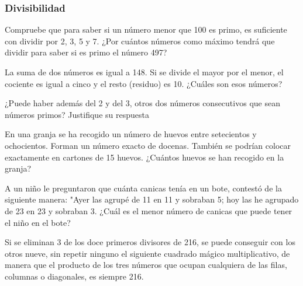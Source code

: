 \documentclass[letterpaper,11pt,twoside]{article}
\begin{document}
\begin{enumerate}
\subsubsection*{Divisibilidad}
\item Compruebe que para saber si un número menor que 100 es primo, es suficiente con dividir por 2, 3, 5 y 7. ¿Por cuántos números como máximo tendrá que dividir para saber si es primo el número 497?
\item La suma de dos números es igual a 148. Si se divide el mayor por el menor, el cociente es igual a cinco y el resto (residuo) es 10. ¿Cuáles son esos números?
\item ¿Puede haber además del 2 y del 3, otros dos números consecutivos que sean números primos? Justifique su respuesta
\item En una granja se ha recogido un número de huevos entre setecientos y ochocientos. Forman un número exacto de docenas. También se podrían colocar exactamente en cartones de 15 huevos. ¿Cuántos huevos se han recogido en la granja?
\item A un niño le preguntaron que cuánta canicas tenía en un bote, contestó de la siguiente manera: "Ayer las agrupé de 11 en 11 y sobraban 5; hoy las he agrupado de 23 en 23 y sobraban 3. ¿Cuál es el menor número de canicas que puede tener el niño en el bote?

\begin{minipage}{.65\textwidth}
\item Si se eliminan 3 de los doce primeros divisores de 216, se puede conseguir con los otros nueve, sin repetir ninguno el siguiente cuadrado mágico multiplicativo, de manera que el producto de los tres números que ocupan cualquiera de las filas, columnas o diagonales, es siempre 216.
\end{minipage} \hfill
\begin{minipage}{.35\textwidth}
\end{minipage}

\end{enumerate}
\end{document}
